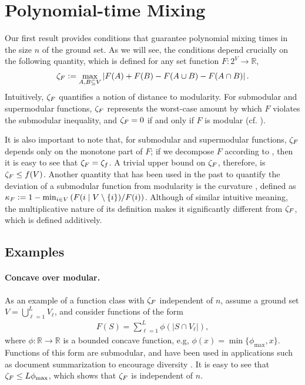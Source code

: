 \section{Polynomial-time Mixing} \label{sect:poly}
Our first result provides conditions that guarantee polynomial mixing times in the size $n$ of the ground set.
As we will see, the conditions depend crucially on the following quantity, which is defined for any set function $F : 2^V \to \mathbb{R}$,
\begin{align*}
  \zeta_F \vcentcolon= \max_{A, B \subseteq V} \left|F(A) + F(B) - F(A \cup B) - F(A \cap B) \right|.
\end{align*}
Intuitively, $\zeta_F$ quantifies a notion of distance to modularity.
For submodular and supermodular functions, $\zeta_F$ represents the worst-case amount by which $F$ violates the submodular inequality, and $\zeta_F = 0$ if and only if $F$ is modular (cf. ).

It is also important to note that, for submodular and supermodular functions, $\zeta_F$ depends only on the monotone part of $F$; if we decompose $F$ according to , then it is easy to see that $\zeta_F = \zeta_f$.
A trivial upper bound on $\zeta_F$, therefore, is $\zeta_F \leq f(V)$.
Another quantity that has been used in the past to quantify the deviation of a submodular function from modularity is the curvature \citep{conforti84}, defined as $\kappa_F \vcentcolon= 1 - \min_{i \in V} \left(F(i\mid V\setminus\{i\}) / F(i)\right)$.
Although of similar intuitive meaning, the multiplicative nature of its definition makes it significantly different from $\zeta_F$, which is defined additively.

\subsection{Examples}
\paragraph{Concave over modular.}
As an example of a function class with $\zeta_F$ independent of $n$, assume a ground set $V = \bigcup_{\ell = 1}^L V_{\ell}$, and consider functions of the form
\begin{align*}
F(S) = \sum_{\ell = 1}^L \phi(|S \cap V_{\ell}|),
\end{align*}
where $\phi : \mathbb{R} \to \mathbb{R}$ is a bounded concave function, e.g, $\phi(x) = \min\{\phi_{\max}, x\}$.
Functions of this form are submodular, and have been used in applications such as document summarization to encourage diversity \citep{lin11}.
It is easy to see that $\zeta_F \leq L\phi_{\max}$, which shows that $\zeta_F$ is independent of $n$.

